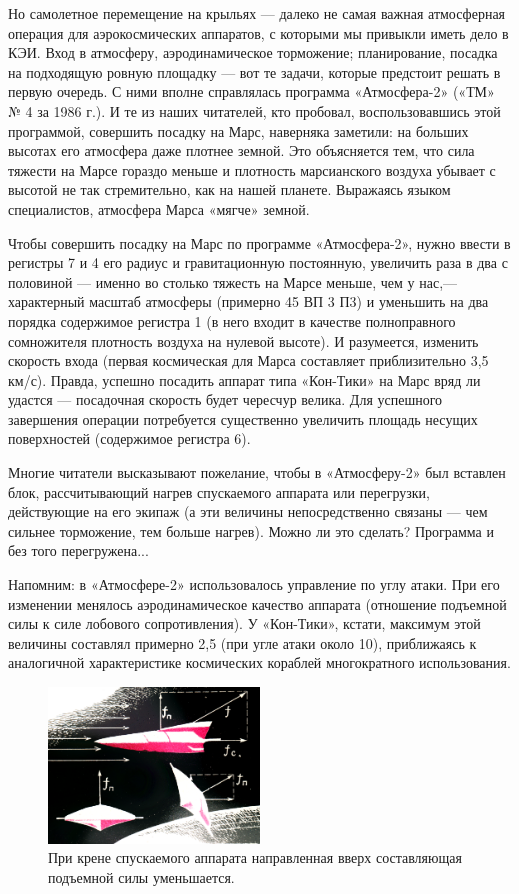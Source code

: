 \documentclass[11pt,a4paper,oneside]{article}
\begin{document}
Но самолетное перемещение на крыльях — далеко не самая важная атмосферная операция для аэрокосмических аппаратов, с которыми мы привыкли иметь дело в КЭИ. Вход в атмосферу, аэродинамическое торможение; планирование, посадка на подходящую ровную площадку — вот те задачи, которые предстоит решать в первую очередь. С ними вполне справлялась программа «Атмосфера-2» («ТМ» № 4 за 1986 г.). И те из наших читателей, кто пробовал, воспользовавшись этой программой, совершить посадку на Марс, наверняка заметили: на больших высотах его атмосфера даже плотнее земной. Это объясняется тем, что сила тяжести на Марсе гораздо меньше и плотность марсианского воздуха убывает с высотой не так стремительно, как на нашей планете. Выражаясь языком специалистов, атмосфера Марса «мягче» земной.

Чтобы совершить посадку на Марс по программе «Атмосфера-2», нужно ввести в регистры 7 и 4 его радиус и гравитационную постоянную, увеличить раза в два с половиной — именно во столько тяжесть на Марсе меньше, чем у нас,— характерный масштаб атмосферы (примерно 45 ВП 3 П3) и уменьшить на два порядка содержимое регистра 1 (в него входит в качестве полноправного сомножителя плотность воздуха на нулевой высоте). И разумеется, изменить скорость входа (первая космическая для Марса составляет приблизительно 3,5 км/с). Правда, успешно посадить аппарат типа «Кон-Тики» на Марс вряд ли удастся — посадочная скорость будет чересчур велика. Для успешного завершения операции потребуется существенно увеличить площадь несущих поверхностей (содержимое регистра 6).

Многие читатели высказывают пожелание, чтобы в «Атмосферу-2» был вставлен блок, рассчитывающий нагрев спускаемого аппарата или перегрузки, действующие на его экипаж (а эти величины непосредственно связаны — чем сильнее торможение, тем больше нагрев). Можно ли это сделать? Программа и без того перегружена...

Напомним: в «Атмосфере-2» использовалось управление по углу атаки. При его изменении менялось аэродинамическое качество аппарата (отношение подъемной силы к силе лобового сопротивления). У «Кон-Тики», кстати, максимум этой величины составлял примерно 2,5 (при угле атаки около 10\degree), приближаясь к аналогичной характеристике космических кораблей многократного использования.

\begin{figure}[H]
\includegraphics[width=0.5\textwidth]{atmos3_1}
\caption{При крене спускаемого аппарата направленная вверх составляющая подъемной силы уменьшается.}
\end{figure}
\end{document}
